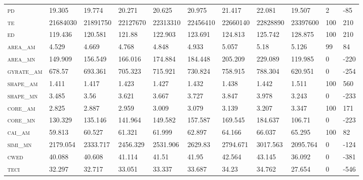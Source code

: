 \begin{landscape}
\begin{table}[!htbp]
\begin{tabular}{@{}llllllll|lll@{}}
\small \textsc{pd}              & 19.305   & 19.774   & 20.271   & 20.625   & 20.975   & 21.417   & 22.081     & 19.507        & 2               & -85  \\
\small \textsc{te}              & 21684030 & 21891750 & 22127670 & 22313310 & 22456410 & 22660140 & 22828890   & 23397600      & 100             & 210  \\
\small \textsc{ed}              & 119.436  & 120.581  & 121.88   & 122.903  & 123.691  & 124.813  & 125.742    & 128.875       & 100             & 210  \\
\small \textsc{area\_am}        & 4.529    & 4.669    & 4.768    & 4.848    & 4.933    & 5.057    & 5.18       & 5.126         & 99              & 84   \\
\small \textsc{area\_mn}        & 149.909  & 156.549  & 166.016  & 174.884  & 184.448  & 205.209  & 229.089    & 119.985       & 0               & -220 \\
\small \textsc{gyrate\_am}      & 678.57   & 693.361  & 705.323  & 715.921  & 730.824  & 758.915  & 788.304    & 620.951       & 0               & -254 \\
\small \textsc{shape\_am}       & 1.411    & 1.417    & 1.423    & 1.427    & 1.432    & 1.438    & 1.442      & 1.511         & 100             & 560  \\
\small \textsc{shape\_mn}       & 3.485    & 3.56     & 3.621    & 3.667    & 3.727    & 3.847    & 3.978      & 3.243         & 0               & -233 \\
\small \textsc{core\_am}        & 2.825    & 2.887    & 2.959    & 3.009    & 3.079    & 3.139    & 3.207      & 3.347         & 100             & 171  \\
\small \textsc{core\_mn}        & 130.329  & 135.146  & 141.964  & 149.582  & 157.587  & 169.545  & 184.637    & 106.71        & 0               & -223 \\
\small \textsc{cai\_am}         & 59.813   & 60.527   & 61.321   & 61.999   & 62.897   & 64.166   & 66.037     & 65.295        & 100             & 82   \\
\small \textsc{simi\_mn}        & 2179.054 & 2333.717 & 2456.329 & 2531.906 & 2629.83  & 2794.671 & 3017.563   & 2095.764      & 0               & -124 \\
\small \textsc{cwed}            & 40.088   & 40.608   & 41.114   & 41.51    & 41.95    & 42.564   & 43.145     & 36.092        & 0               & -381 \\
\small \textsc{teci}            & 32.297   & 32.717   & 33.051   & 33.337   & 33.687   & 34.23    & 34.762     & 27.654        & 0               & -546 \\

\end{tabular}
\end{table}
\end{landscape}
